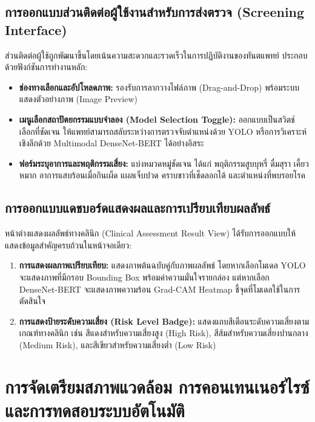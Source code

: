 \subsection{การออกแบบส่วนติดต่อผู้ใช้งานสำหรับการส่งตรวจ (Screening Interface)}
ส่วนติดต่อผู้ใช้ถูกพัฒนาขึ้นโดยเน้นความสะดวกและรวดเร็วในการปฏิบัติงานของทันตแพทย์ ประกอบด้วยฟังก์ชันการทำงานหลัก:
\begin{itemize}
    \item \textbf{ช่องทางเลือกและอัปโหลดภาพ:} รองรับการลากวางไฟล์ภาพ (Drag-and-Drop) พร้อมระบบแสดงตัวอย่างภาพ (Image Preview)
    \item \textbf{เมนูเลือกสถาปัตยกรรมแบบจำลอง (Model Selection Toggle):} ออกแบบเป็นสวิตช์เลือกที่ชัดเจน ให้แพทย์สามารถสลับระหว่างการตรวจจับตำแหน่งด้วย YOLO หรือการวิเคราะห์เชิงลึกด้วย Multimodal DenseNet-BERT ได้อย่างอิสระ
    \item \textbf{ฟอร์มระบุอาการและพฤติกรรมเสี่ยง:} แบ่งหมวดหมู่ชัดเจน ได้แก่ พฤติกรรมสูบบุหรี่ ดื่มสุรา เคี้ยวหมาก อาการแสบร้อนเมื่อกินเผ็ด แผลเจ็บปวด คราบขาวที่เช็ดลอกได้ และตำแหน่งที่พบรอยโรค
\end{itemize}

\subsection{การออกแบบแดชบอร์ดแสดงผลและการเปรียบเทียบผลลัพธ์}
หน้าต่างแสดงผลลัพธ์ทางคลินิก (Clinical Assessment Result View) ได้รับการออกแบบให้แสดงข้อมูลสำคัญครบถ้วนในหน้าจอเดียว:
\begin{enumerate}
    \item \textbf{การแสดงผลภาพเปรียบเทียบ:} แสดงภาพต้นฉบับคู่กับภาพผลลัพธ์ โดยหากเลือกโมเดล YOLO จะแสดงภาพที่มีกรอบ Bounding Box พร้อมค่าความมั่นใจรายกล่อง แต่หากเลือก DenseNet-BERT จะแสดงภาพความร้อน Grad-CAM Heatmap ชี้จุดที่โมเดลใช้ในการตัดสินใจ
    \item \textbf{การแสดงป้ายระดับความเสี่ยง (Risk Level Badge):} แสดงแถบสีเตือนระดับความเสี่ยงตามเกณฑ์ทางคลินิก เช่น สีแดงสำหรับความเสี่ยงสูง (High Risk), สีส้มสำหรับความเสี่ยงปานกลาง (Medium Risk), และสีเขียวสำหรับความเสี่ยงต่ำ (Low Risk)
\end{enumerate}

\section{การจัดเตรียมสภาพแวดล้อม การคอนเทนเนอร์ไรซ์ และการทดสอบระบบอัตโนมัติ}
\label{sec:devops_and_testing}


